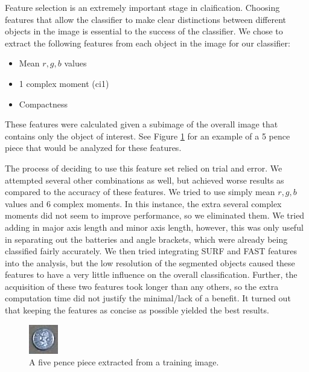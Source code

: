 \documentclass[12pt]{article}
\begin{document}
Feature selection is an extremely important stage in claification. Choosing features that allow the classifier to make clear distinctions between different objects in the image is essential to the success of the classifier. We chose to extract the following features from each object in the image for our classifier:

\begin{itemize}
	\item Mean $r,g,b$ values
	\item 1 complex moment (ci1)
	\item Compactness
\end{itemize}

These features were calculated given a subimage of the overall image that contains only the object of interest. See Figure \ref{fig:5pencesub} for an example of a 5 pence piece that would be analyzed for these features.

The process of deciding to use this feature set relied on trial and error. We attempted several other combinations as well, but achieved worse results as compared to the accuracy of these features. We tried to use simply mean $r,g,b$ values and 6 complex moments. In this instance, the extra several complex moments did not seem to improve performance, so we eliminated them. We tried adding in major axis length and minor axis length, however, this was only useful in separating out the batteries and angle brackets, which were already being classified fairly accurately. We then tried integrating SURF and FAST features into the analysis, but the low resolution of the segmented objects caused these features to have a very little influence on the overall classification. Further, the acquisition of these two features took longer than any others, so the extra computation time did not justify the minimal/lack of a benefit. It turned out that keeping the features as concise as possible yielded the best results.

\begin{figure}
	\centering
	\includegraphics[width=0.5\linewidth]{subimage}
	\caption{A five pence piece extracted from a training image.}
	\label{fig:5pencesub}
\end{figure}
\end{document}
